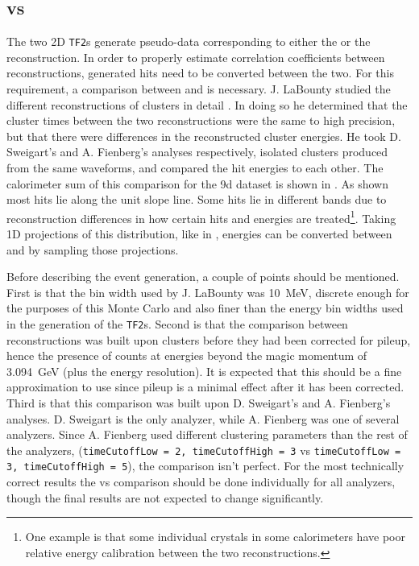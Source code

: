 \subsection{\RE vs \RW}

The two 2D \texttt{TF2}s generate pseudo-data corresponding to either the \RE or the \RW reconstruction. In order to properly estimate correlation coefficients between reconstructions, generated hits need to be converted between the two. For this requirement, a comparison between \RE and \RW is necessary. J. LaBounty studied the different reconstructions of clusters in detail \cite{JoshEvW}. In doing so he determined that the cluster times between the two reconstructions were the same to high precision, but that there were differences in the reconstructed cluster energies. He took D. Sweigart's \RE and A. Fienberg's \RW analyses respectively, isolated clusters produced from the same waveforms, and compared the hit energies to each other. The calorimeter sum of this comparison for the 9d dataset is shown in . As shown most hits lie along the unit slope line. Some hits lie in different bands due to reconstruction differences in how certain hits and energies are treated\footnote{One example is that some individual crystals in some calorimeters have poor relative energy calibration between the two reconstructions.}. Taking 1D projections of this distribution, like in , energies can be converted between \RE and \RW by sampling those projections.


Before describing the event generation, a couple of points should be mentioned. First is that the bin width used by J. LaBounty was \SI{10}{\MeV}, discrete enough for the purposes of this Monte Carlo and also finer than the energy bin widths used in the generation of the \texttt{TF2}s. Second is that the comparison between reconstructions was built upon clusters before they had been corrected for pileup, hence the presence of counts at energies beyond the magic momentum of \SI{3.094}{\GeV} (plus the energy resolution). It is expected that this should be a fine approximation to use since pileup is a minimal effect after it has been corrected. Third is that this comparison was built upon D. Sweigart's and A. Fienberg's analyses. D. Sweigart is the only \RE analyzer, while A. Fienberg was one of several \RW analyzers. Since A. Fienberg used different clustering parameters than the rest of the \RW analyzers, (\texttt{timeCutoffLow = 2, timeCutoffHigh = 3} vs \texttt{timeCutoffLow = 3, timeCutoffHigh = 5}), the comparison isn't perfect. For the most technically correct results the \RE vs \RW comparison should be done individually for all analyzers, though the final results are not expected to change significantly.



